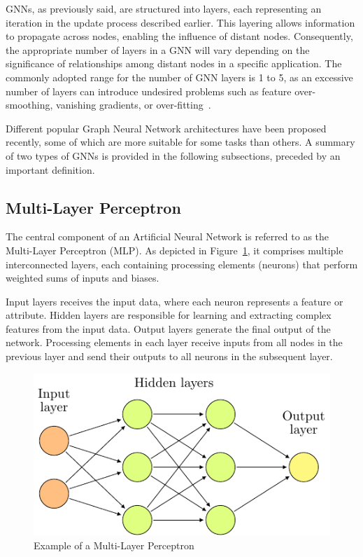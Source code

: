 GNNs, as previously said, are structured into layers, each representing an iteration in the update process described earlier.
This layering allows information to propagate across nodes, enabling the influence of distant nodes.
Consequently, the appropriate number of layers in a GNN will vary depending on the significance of relationships among distant nodes in a specific application.
The commonly adopted range for the number of GNN layers is 1 to 5, as an excessive number of layers can introduce undesired problems such as feature over-smoothing, vanishing gradients, or over-fitting~\cite{DBLP:journals/corr/abs-1801-07606}.

Different popular Graph Neural Network architectures have been proposed recently, some of which are more suitable for some tasks than others.
A summary of two types of GNNs is provided in the following subsections, preceded by an important definition.

\subsection{Multi-Layer Perceptron}
\label{subsec:mlp}%
The central component of an Artificial Neural Network is referred to as the Multi-Layer Perceptron (MLP).
As depicted in Figure~\ref{fig:mlp}, it comprises multiple interconnected layers, each containing processing elements (neurons) that perform weighted sums of inputs and biases.

Input layers receives the input data, where each neuron represents a feature or attribute.
Hidden layers are responsible for learning and extracting complex features from the input data.
Output layers generate the final output of the network.
Processing elements in each layer receive inputs from all nodes in the previous layer and send their outputs to all neurons in the subsequent layer.

\begin{figure}[t]
    \centering
    \includegraphics[height=0.3\textwidth]{Images/multi-layer-perceptron}
    \caption{Example of a Multi-Layer Perceptron}
    \label{fig:mlp}
\end{figure}

